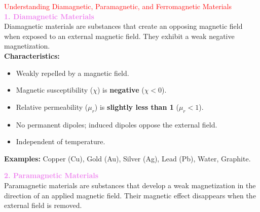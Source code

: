 \documentclass{beamer}
\begin{document}
\begin{frame}

\textcolor{red}{Understanding Diamagnetic, Paramagnetic, and Ferromagnetic Materials}\\

\textcolor{violet}{\textbf{1. Diamagnetic Materials}}\\
Diamagnetic materials are substances that create an opposing magnetic field when exposed to an external magnetic field. They exhibit a weak negative magnetization.\\

\textbf{Characteristics:}
\begin{itemize}
    \item Weakly repelled by a magnetic field.
    \item Magnetic susceptibility ($\chi$) is \textbf{negative} ($\chi < 0$).
    \item Relative permeability ($\mu_r$) is \textbf{slightly less than 1} ($\mu_r < 1$).
    \item No permanent dipoles; induced dipoles oppose the external field.
    \item Independent of temperature.
\end{itemize}

\textbf{Examples:} Copper (Cu), Gold (Au), Silver (Ag), Lead (Pb), Water, Graphite.

\textcolor{violet}{\textbf{2. Paramagnetic Materials}}\\
Paramagnetic materials are substances that develop a weak magnetization in the direction of an applied magnetic field. Their magnetic effect disappears when the external field is removed.

\end{frame}
\end{document}
